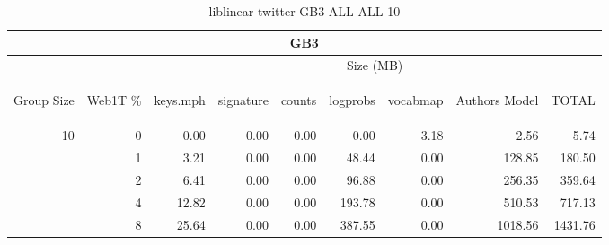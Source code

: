 \begin{center}
\begin{table}[htbp] 
 \begin{center}
\begin{tabular}{ | r | r | r | r | r | r | r | r | r |}
\hline
\multicolumn{9}{|c|}{GB3}\\
\hline
 & & \multicolumn{7}{|c|}{Size (MB)}\\ \cline{3-9}
\begin{sideways}Group Size\end{sideways} & \begin{sideways}Web1T \% \end{sideways} & \begin{sideways}keys.mph\end{sideways} & \begin{sideways}signature\end{sideways} & \begin{sideways}counts\end{sideways} & \begin{sideways}logprobs\end{sideways} & \begin{sideways}vocabmap\end{sideways} & \begin{sideways}Authors Model \end{sideways} & \begin{sideways}TOTAL\end{sideways}\\
\hline
\multirow{4}{*}{10}
 & 0 & 0.00 & 0.00 & 0.00 & 0.00 & 3.18 & 2.56 & 5.74\\ \cline{2-9}
 & 1 & 3.21 & 0.00 & 0.00 & 48.44 & 0.00 & 128.85 & 180.50\\ \cline{2-9}
 & 2 & 6.41 & 0.00 & 0.00 & 96.88 & 0.00 & 256.35 & 359.64\\ \cline{2-9}
 & 4 & 12.82 & 0.00 & 0.00 & 193.78 & 0.00 & 510.53 & 717.13\\ \cline{2-9}
 & 8 & 25.64 & 0.00 & 0.00 & 387.55 & 0.00 & 1018.56 & 1431.76\\ \cline{2-9}
\hline
\end{tabular}
\caption{liblinear-twitter-GB3-ALL-ALL-10}
\label{table:liblinear-twitter-GB3-ALL-ALL-10}
\end{center}
 \end{table}
\end{center}

